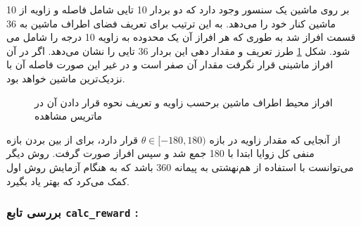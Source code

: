 بر روی ماشین یک سنسور وجود دارد که دو بردار 10 تایی شامل فاصله و زاویه از 10 ماشین کنار خود را می‌دهد. به این ترتیب برای تعریف  فضای اطراف ماشین به 36 قسمت افراز شد به طوری که هر افراز آن یک محدوده به زاویه 10 درجه را شامل می شود. 
شکل \ref{fig:agent-degree-total} طرز تعریف و مقدار دهی این بردار 36 تایی را نشان می‌دهد.
اگر در آن افراز ماشینی قرار نگرفت مقدار آن صفر است و در غیر این صورت فاصله آن با نزدیک‌ترین ماشین خواهد بود.

\begin{figure}
	\centering
	\hspace*{0.05\linewidth}
	\caption[افراز محیط اطراف ماشین برحسب زاویه]{افراز محیط اطراف ماشین برحسب زاویه و تعریف نحوه قرار دادن آن در ماتریس مشاهده }
	\label{fig:agent-degree-total}
\end{figure}

\begin{note}
	از آنجایی که مقدار زاویه در بازه $\theta \in [-180,180)$ قرار دارد، برای از بین بردن بازه منفی کل زوایا ابتدا با 180 جمع شد و سپس افراز صورت گرفت. روش دیگر می‌توانست با استفاده از هم‌نهشتی به پیمانه 360 باشد که به هنگام آزمایش روش اول کمک می‌کرد که بهتر یاد بگیرد.
\end{note}


\subsubsection{بررسی تابع \textbf{\texttt{calc\_reward} :}}

